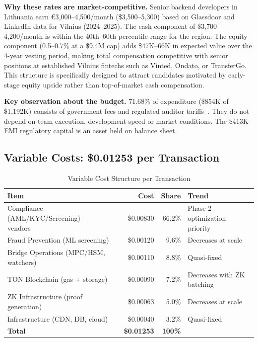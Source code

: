 \documentclass[11pt,a4paper]{article}
\begin{document}
\noindent\textbf{Why these rates are market-competitive.} Senior backend developers in Lithuania earn \euro 3,000--4,500/month (\$3,500--5,300) based on Glassdoor and LinkedIn data for Vilnius (2024--2025). The cash component of \$3,700--4,200/month is within the 40th--60th percentile range for the region. The equity component (0.5--0.7\% at a \$9.4M cap) adds \$47K--66K in expected value over the 4-year vesting period, making total compensation competitive with senior positions at established Vilnius fintechs such as Vinted, Ondato, or TransferGo. This structure is specifically designed to attract candidates motivated by early-stage equity upside rather than top-of-market cash compensation.

\begin{tcolorbox}[successbox]
\textbf{Key observation about the budget.} 71.68\% of expenditure (\$854K of \$1,192K) consists of government fees and regulated auditor tariffs~\cite{lb_emi,dora_reg,iso27001,tiber_eu}. They do not depend on team execution, development speed or market conditions. The \$413K EMI regulatory capital is an asset held on balance sheet.
\end{tcolorbox}

\subsection*{Variable Costs: \$0.01253 per Transaction}

\begin{table}[htbp]
\centering
\caption{Variable Cost Structure per Transaction}
\begin{tabularx}{\linewidth}{@{}Xrrl@{}}
\toprule
\textbf{Item} & \textbf{Cost} & \textbf{Share} & \textbf{Trend} \\
\midrule
Compliance (AML/KYC/Screening) --- vendors~\cite{fatf_aml_tech,fatf_rec}  & \$0.00830 & 66.2\% & \textcolor{warnred}{Phase 2 optimization priority} \\
Fraud Prevention (ML screening)             & \$0.00120 & 9.6\%  & Decreases at scale \\
Bridge Operations (MPC/HSM, watchers)       & \$0.00110 & 8.8\%  & Quasi-fixed \\
TON Blockchain (gas + storage)~\cite{ton_docs}              & \$0.00090 & 7.2\%  & Decreases with ZK batching \\
ZK Infrastructure (proof generation)~\cite{plonky2,groth16}        & \$0.00063 & 5.0\%  & Decreases at scale \\
Infrastructure (CDN, DB, cloud)             & \$0.00040 & 3.2\%  & Quasi-fixed \\
\midrule
\textbf{Total}                              & \textbf{\$0.01253} & \textbf{100\%} & \\
\bottomrule
\end{tabularx}
\end{table}
\end{document}
